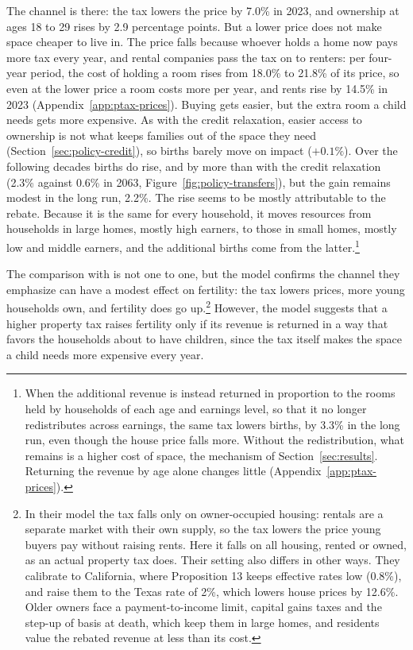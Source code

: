 The channel is there: the tax lowers the price by 7.0\% in 2023, and
ownership at ages 18 to 29 rises by 2.9 percentage points. But a lower price
does not make space cheaper to live in. The price falls because whoever holds
a home now pays more tax every year, and rental companies pass the tax on to renters:
per four-year period, the cost of holding a room rises from 18.0\% to 21.8\%
of its price, so even at the lower price a room costs more per year, and rents
rise by 14.5\% in 2023 (Appendix~\ref{app:ptax-prices}). Buying gets easier, but the extra room a child needs
gets more expensive. As with the credit relaxation, easier access to ownership
is not what keeps families out of the space they need
(Section~\ref{sec:policy-credit}), so births barely move on impact
($+0.1\%$). Over the following decades births do rise, and by more than with
the credit relaxation (2.3\% against 0.6\% in 2063,
Figure~\ref{fig:policy-transfers}), but the gain remains modest in the long
run, 2.2\%. The rise seems to be mostly attributable to the rebate.
Because it is the same for every household, it moves resources from households
in large homes, mostly high earners, to those in small homes, mostly low and
middle earners, and the additional births come from the
latter.\footnote{When the additional revenue is instead returned in proportion
to the rooms held by households of each age and earnings level, so that it no
longer redistributes across earnings, the same tax lowers births, by 3.3\% in
the long run, even though the house price falls more. Without the
redistribution, what remains is a higher cost of space, the mechanism of
Section~\ref{sec:results}. Returning the revenue by age alone changes
little (Appendix~\ref{app:ptax-prices}).}

The comparison with \citet{coven2026} is not one to one, but the model
confirms the channel they emphasize can have a modest effect on fertility: the tax lowers prices, more young
households own, and fertility does go up.\footnote{In their model the tax falls only on owner-occupied
housing: rentals are a separate market with their own supply, so the tax
lowers the price young buyers pay without raising rents. Here it falls on all
housing, rented or owned, as an actual property tax does. Their setting also
differs in other ways. They calibrate to California, where Proposition 13
keeps effective rates low (0.8\%), and raise them to the Texas rate of 2\%,
which lowers house prices by 12.6\%. Older owners face a
payment-to-income limit, capital gains taxes and the step-up of basis at
death, which keep them in large homes, and residents value the rebated
revenue at less than its cost.} However, the model suggests that a higher
property tax raises fertility only if its revenue is returned in a way that
favors the households about to have children, since the tax itself makes the
space a child needs more expensive every year.

